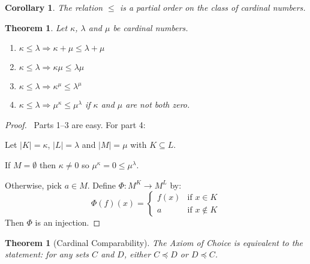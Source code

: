 \documentclass{report}
\let\qed\relax
\newtheorem{theorem}[axiom]{Theorem}
\newtheorem{corollary}{Corollary}[axiom]
\theoremstyle{definition}
\begin{document}
    \begin{corollary}
        The relation $\leq$ is a partial order on the class of cardinal numbers.
    \end{corollary}

    \begin{theorem}
        Let $\kappa$, $\lambda$ and $\mu$ be cardinal numbers.
        \begin{enumerate}
            \item $\kappa \leq \lambda \Rightarrow \kappa + \mu \leq \lambda + \mu$
            \item $\kappa \leq \lambda \Rightarrow \kappa \mu \leq \lambda \mu$
            \item $\kappa \leq \lambda \Rightarrow \kappa^\mu \leq \lambda^\mu$
            \item $\kappa \leq \lambda \Rightarrow \mu^\kappa \leq \mu^\lambda$ if $\kappa$ and $\mu$
            are not both zero.
        \end{enumerate}
    \end{theorem}

    \begin{proof}
        \pf\ Parts 1--3 are easy. For part 4:
        
        Let $|K| = \kappa$, $|L| = \lambda$ and $|M| = \mu$ with $K \subseteq L$.

        If $M = \emptyset$ then $\kappa \neq 0$ so $\mu^\kappa = 0 \leq \mu^\lambda$.

        Otherwise, pick $a \in M$. Define $\Phi : M^K \rightarrow M^L$ by:
        \[ \Phi(f)(x) = \begin{cases}
            f(x) & \text{if } x \in K \\
            a & \text{if } x \notin K
        \end{cases} \]
        Then $\Phi$ is an injection. \qed
    \end{proof}

    \begin{theorem}[Cardinal Comparability]
        The Axiom of Choice is equivalent to the statement: for any sets $C$ and $D$,
        either $C \preccurlyeq D$ or $D \preccurlyeq C$.
    \end{theorem}
\end{document}
